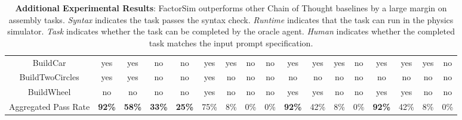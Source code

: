 \documentclass{article}
\theoremstyle{plain}
\theoremstyle{definition}
\theoremstyle{remark}
\begin{document}
\begin{table}[]
{\begin{tabular}{|c|cccc||cccc||cccc||cccc|}
BuildCar                            & \multicolumn{1}{c|}{{\color[HTML]{11734B} yes}} & \multicolumn{1}{c|}{{\color[HTML]{11734B} yes}} & \multicolumn{1}{c|}{{\color[HTML]{B10202} no}}  & {\color[HTML]{B10202} no}  & \multicolumn{1}{c|}{{\color[HTML]{11734B} yes}} & \multicolumn{1}{c|}{{\color[HTML]{11734B} yes}} & \multicolumn{1}{c|}{{\color[HTML]{B10202} no}} & {\color[HTML]{B10202} no}  & \multicolumn{1}{c|}{{\color[HTML]{11734B} yes}} & \multicolumn{1}{c|}{{\color[HTML]{11734B} yes}} & \multicolumn{1}{c|}{{\color[HTML]{11734B} yes}} & {\color[HTML]{B10202} no}  & \multicolumn{1}{c|}{{\color[HTML]{11734B} yes}} & \multicolumn{1}{c|}{{\color[HTML]{11734B} yes}} & \multicolumn{1}{c|}{{\color[HTML]{11734B} yes}} & {\color[HTML]{B10202} no}  \\
BuildTwoCircles                     & \multicolumn{1}{c|}{{\color[HTML]{11734B} yes}} & \multicolumn{1}{c|}{{\color[HTML]{11734B} yes}} & \multicolumn{1}{c|}{{\color[HTML]{B10202} no}}  & {\color[HTML]{B10202} no}  & \multicolumn{1}{c|}{{\color[HTML]{11734B} yes}} & \multicolumn{1}{c|}{{\color[HTML]{B10202} no}}  & \multicolumn{1}{c|}{{\color[HTML]{B10202} no}} & {\color[HTML]{B10202} no}  & \multicolumn{1}{c|}{{\color[HTML]{B10202} no}}  & \multicolumn{1}{c|}{{\color[HTML]{B10202} no}}  & \multicolumn{1}{c|}{{\color[HTML]{B10202} no}}  & {\color[HTML]{B10202} no}  & \multicolumn{1}{c|}{{\color[HTML]{B10202} no}}  & \multicolumn{1}{c|}{{\color[HTML]{B10202} no}}  & \multicolumn{1}{c|}{{\color[HTML]{B10202} no}}  & {\color[HTML]{B10202} no}  \\
BuildWheel                          & \multicolumn{1}{c|}{{\color[HTML]{B10202} no}}  & \multicolumn{1}{c|}{{\color[HTML]{B10202} no}}  & \multicolumn{1}{c|}{{\color[HTML]{B10202} no}}  & {\color[HTML]{B10202} no}  & \multicolumn{1}{c|}{{\color[HTML]{11734B} yes}} & \multicolumn{1}{c|}{{\color[HTML]{B10202} no}}  & \multicolumn{1}{c|}{{\color[HTML]{B10202} no}} & {\color[HTML]{B10202} no}  & \multicolumn{1}{c|}{{\color[HTML]{11734B} yes}} & \multicolumn{1}{c|}{{\color[HTML]{11734B} yes}} & \multicolumn{1}{c|}{{\color[HTML]{B10202} no}}  & {\color[HTML]{B10202} no}  & \multicolumn{1}{c|}{{\color[HTML]{11734B} yes}} & \multicolumn{1}{c|}{{\color[HTML]{11734B} yes}} & \multicolumn{1}{c|}{{\color[HTML]{B10202} no}}  & {\color[HTML]{B10202} no}  \\ \hline
Aggregated Pass Rate & \textbf{92\%} & \textbf{58\%} & \textbf{33\%} & \textbf{25\%} & 75\% & 8\% & 0\% & 0\% & \textbf{92\%} & 42\% &  8\% & 0\% & \textbf{92\%} & 42\% & 8\% & 0\% \\
\bottomrule
\end{tabular}
}
\vspace{3mm}
\caption{\textbf{Additional Experimental Results}: FactorSim outperforms other Chain of Thought baselines by a large margin on assembly tasks. \textit{Syntax} indicates the task passes the syntax check. \textit{Runtime} indicates that the task can run in the physics simulator. \textit{Task} indicates whether the task can  be completed by the oracle agent. \textit{Human} indicates whether the completed task matches the input prompt specification.}
\end{table} 
\end{document}
